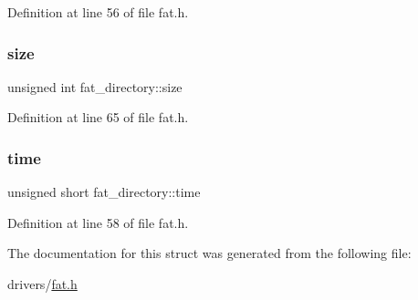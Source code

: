 Definition at line 56 of file fat.\+h.

\mbox{\label{structfat__directory_a08766899120efa9bd031afe12edad492_a08766899120efa9bd031afe12edad492}} 
\subsubsection{\texorpdfstring{size}{size}}
{\footnotesize\ttfamily unsigned int fat\+\_\+directory\+::size}



Definition at line 65 of file fat.\+h.

\mbox{\label{structfat__directory_a2bfa6f8f103ed1d1ecbab0bc2ed5b650_a2bfa6f8f103ed1d1ecbab0bc2ed5b650}} 
\subsubsection{\texorpdfstring{time}{time}}
{\footnotesize\ttfamily unsigned short fat\+\_\+directory\+::time}



Definition at line 58 of file fat.\+h.



The documentation for this struct was generated from the following file\+:\begin{DoxyCompactItemize}
\item 
drivers/\hyperlink{fat_8h}{fat.\+h}\end{DoxyCompactItemize}
